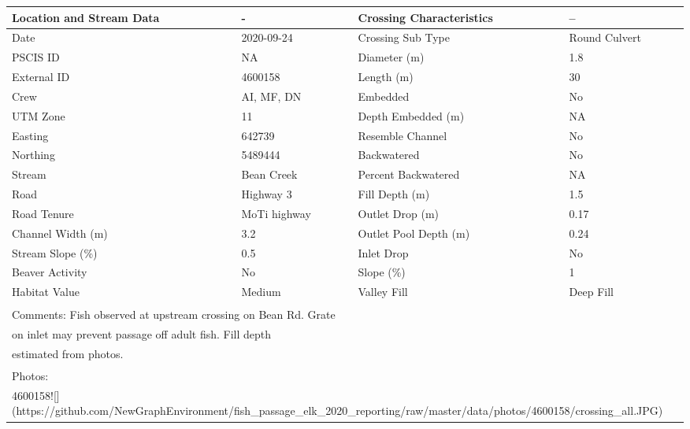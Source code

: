 \documentclass[
]{book}
\begin{document}
\begin{tabular}{l|l|l|l}
\hline
Location and Stream Data & - & Crossing Characteristics & --\\
\hline
Date & 2020-09-24 & Crossing Sub Type & Round Culvert\\
\hline
PSCIS ID & NA & Diameter (m) & 1.8\\
\hline
External ID & 4600158 & Length (m) & 30\\
\hline
Crew & AI, MF, DN & Embedded & No\\
\hline
UTM Zone & 11 & Depth Embedded (m) & NA\\
\hline
Easting & 642739 & Resemble Channel & No\\
\hline
Northing & 5489444 & Backwatered & No\\
\hline
Stream & Bean Creek & Percent Backwatered & NA\\
\hline
Road & Highway 3 & Fill Depth (m) & 1.5\\
\hline
Road Tenure & MoTi highway & Outlet Drop (m) & 0.17\\
\hline
Channel Width (m) & 3.2 & Outlet Pool Depth (m) & 0.24\\
\hline
Stream Slope (\%) & 0.5 & Inlet Drop & No\\
\hline
Beaver Activity & No & Slope (\%) & 1\\
\hline
Habitat Value & Medium & Valley Fill & Deep Fill\\
\hline
\multicolumn{4}{l}{\textsuperscript{} Comments: Fish observed at upstream crossing on Bean Rd.  Grate}\\
\multicolumn{4}{l}{on inlet may prevent passage off adult fish.  Fill depth}\\
\multicolumn{4}{l}{estimated from photos.}\\
\multicolumn{4}{l}{\textsuperscript{} Photos:}\\
\multicolumn{4}{l}{4600158![](https://github.com/NewGraphEnvironment/fish\_passage\_elk\_2020\_reporting/raw/master/data/photos/4600158/crossing\_all.JPG)}\\
\end{tabular}
\end{document}
